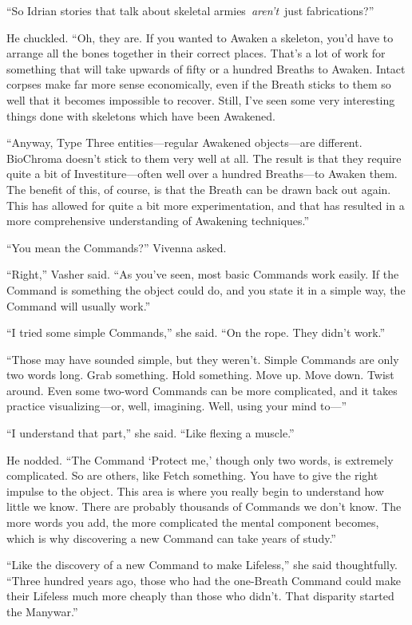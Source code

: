 “So Idrian stories that talk about skeletal armies~\textit{aren’t}~just fabrications?”

He chuckled. “Oh, they are. If you wanted to Awaken a skeleton, you’d have to arrange all the bones together in their correct places. That’s a lot of work for something that will take upwards of fifty or a hundred Breaths to Awaken. Intact corpses make far more sense economically, even if the Breath sticks to them so well that it becomes impossible to recover. Still, I’ve seen some very interesting things done with skeletons which have been Awakened.

“Anyway, Type Three entities—regular Awakened objects—are different. BioChroma doesn’t stick to them very well at all. The result is that they require quite a bit of Investiture—often well over a hundred Breaths—to Awaken them. The benefit of this, of course, is that the Breath can be drawn back out again. This has allowed for quite a bit more experimentation, and that has resulted in a more comprehensive understanding of Awakening techniques.”

“You mean the Commands?” Vivenna asked.

“Right,” Vasher said. “As you’ve seen, most basic Commands work easily. If the Command is something the object could do, and you state it in a simple way, the Command will usually work.”

“I tried some simple Commands,” she said. “On the rope. They didn’t work.”

“Those may have sounded simple, but they weren’t. Simple Commands are only two words long. Grab something. Hold something. Move up. Move down. Twist around. Even some two-word Commands can be more complicated, and it takes practice visualizing—or, well, imagining. Well, using your mind to—”

“I understand that part,” she said. “Like flexing a muscle.”

He nodded. “The Command ‘Protect me,’ though only two words, is extremely complicated. So are others, like Fetch something. You have to give the right impulse to the object. This area is where you really begin to understand how little we know. There are probably thousands of Commands we don’t know. The more words you add, the more complicated the mental component becomes, which is why discovering a new Command can take years of study.”

“Like the discovery of a new Command to make Lifeless,” she said thoughtfully. “Three hundred years ago, those who had the one-Breath Command could make their Lifeless much more cheaply than those who didn’t. That disparity started the Manywar.”

